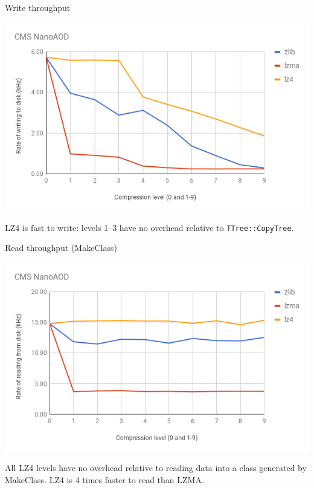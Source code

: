 \documentclass{beamer}
\begin{document}
\begin{frame}{Write throughput}
\begin{center}
\includegraphics[width=\linewidth]{write-vs-compression.png}
\end{center}

LZ4 is fast to write: levels 1--3 have no overhead relative to {\tt TTree::CopyTree}.
\end{frame}

\begin{frame}{Read throughput (MakeClass)}
\begin{center}
\includegraphics[width=\linewidth]{read-vs-compression.png}
\end{center}

All LZ4 levels have no overhead relative to reading data into a class generated by MakeClass. LZ4 is 4 times faster to read than LZMA.
\end{frame}
\end{document}
